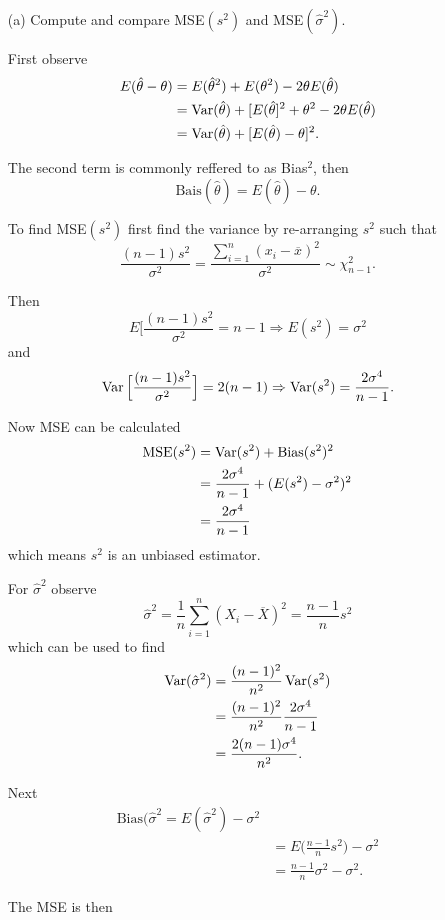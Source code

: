 \documentclass{tufte-book}
\begin{document}
\begin{enumerate}
\item[(a)] Compute and compare MSE$(s^2)$ and MSE$(\hat{\sigma}^2)$.

First observe
\begin{align*}
E(\hat{\theta} - \theta) &= E(\hat{\theta}^2) + E(\theta^2) - 2\theta E(\hat{\theta})\\
&= \operatorname{Var}(\hat{\theta}) + [E(\hat{\theta}]^2 + \theta^2 - 2\theta E(\hat{\theta})\\
&= \operatorname{Var}(\hat{\theta}) + [E(\hat{\theta}) - \theta]^2.
\end{align*}

The second term is commonly reffered to as Bias$^2$, then
\[ \text{Bais}(\hat{\theta})=E(\hat{\theta})-\theta. \]

To find MSE$(s^2)$ first find the variance by re-arranging $s^2$ such that
\[ \frac{(n-1)s^2}{\sigma^2} = \frac{\sum_{i=1}^n(x_i -\overline{x})^2}{\sigma^2} \sim \chi_{n-1}^2. \]

Then
\[ E\Big[\frac{(n-1)s^2}{\sigma^2} = n-1 \Rightarrow E(s^2)=\sigma^2 \]
and
\[ \operatorname{Var}\Big[\frac{(n-1)s^2}{\sigma^2}\Big] = 2(n-1) \Rightarrow \operatorname{Var}(s^2)=\frac{2\sigma^4}{n-1}. \]

Now MSE can be calculated
\begin{align*}
\text{MSE}(s^2) &= \operatorname{Var}(s^2) + \text{Bias}(s^2)^2\\
&=\frac{2\sigma^4}{n-1} + (E(s^2) - \sigma^2)^2\\
&= \frac{2\sigma^4}{n-1}
\end{align*}
which means $s^2$ is an unbiased estimator.

For $\hat{\sigma}^2$ observe
\[ \hat{\sigma}^2 = \frac{1}{n}\sum_{i=1}^n(X_i-\overline{X})^2 = \frac{n-1}{n}s^2 \]
which can be used to find
\begin{align*}
\operatorname{Var}(\hat{\sigma}^2)&= \frac{(n-1)^2}{n^2}\operatorname{Var}(s^2)\\
&=\frac{(n-1)^2}{n^2}\frac{2\sigma^4}{n-1}\\
&= \frac{2(n-1)\sigma^4}{n^2}.
\end{align*}

Next
\begin{align*}
\text{Bias}(\hat{\sigma}^2=E(\hat{\sigma}^2) - \sigma^2\\
&=E\Big(\frac{n-1}{n}s^2\Big) - \sigma^2\\
&= \frac{n-1}{n}\sigma^2 - \sigma^2.
\end{align*}


The MSE is then


\end{enumerate}
\end{document}
